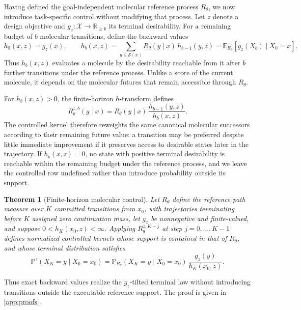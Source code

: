 \documentclass{article}
\newtheorem{theorem}{Theorem}
\theoremstyle{definition}
\theoremstyle{remark}
\newcommand{\X}{\mathcal{X}}
\newcommand{\Sset}{\mathcal{S}}
\newcommand{\E}{\mathbb{E}}
\newcommand{\Prob}{\mathbb{P}}
\newcommand{\R}{\mathbb{R}}
\begin{document}
Having defined the goal-independent molecular reference process $R_\theta$, we now introduce task-specific control without modifying that process. Let $z$ denote a design objective and $g_z:\X\rightarrow\R_{\ge0}$ its terminal desirability. For a remaining budget of $b$ molecular transitions, define the backward values
\begin{equation}
h_0(x,z)=g_z(x),\qquad
h_b(x,z)=\sum_{y\in\Sset(x)}R_\theta(y\mid x)\,h_{b-1}(y,z)
=\E_{R_\theta}\!\left[g_z(X_b)\mid X_0=x\right].
\label{eq:backward}
\end{equation}
Thus $h_b(x,z)$ evaluates a molecule by the desirability reachable from it after $b$ further transitions under the reference process. Unlike a score of the current molecule, it depends on the molecular futures that remain accessible through $R_\theta$.

For $h_b(x,z)>0$, the finite-horizon $h$-transform defines
\begin{equation}
R^{z,b}_\theta(y\mid x)=R_\theta(y\mid x)\,\frac{h_{b-1}(y,z)}{h_b(x,z)}.
\label{eq:doob}
\end{equation}
The controlled kernel therefore reweights the same canonical molecular successors according to their remaining future value: a transition may be preferred despite little immediate improvement if it preserves access to desirable states later in the trajectory. If $h_b(x,z)=0$, no state with positive terminal desirability is reachable within the remaining budget under the reference process, and we leave the controlled row undefined rather than introduce probability outside its support.

\begin{theorem}[Finite-horizon molecular control]
\label{thm:doob}
Let $R_\theta$ define the reference path measure over $K$ committed transitions from $x_0$, with trajectories terminating before $K$ assigned zero continuation mass, let $g_z$ be nonnegative and finite-valued, and suppose $0<h_K(x_0,z)<\infty$. Applying $R_\theta^{z,K-j}$ at step $j=0,\dots,K-1$ defines normalized controlled kernels whose support is contained in that of $R_\theta$, and whose terminal distribution satisfies
\begin{equation}
\Prob^{z}(X_K=y\mid X_0=x_0)=\Prob_{R_\theta}(X_K=y\mid X_0=x_0)\,\frac{g_z(y)}{h_K(x_0,z)}.
\label{eq:tilt}
\end{equation}
\end{theorem}

Thus exact backward values realize the $g_z$-tilted terminal law without introducing transitions outside the executable reference support. The proof is given in \cref{app:proofs}.
\end{document}
